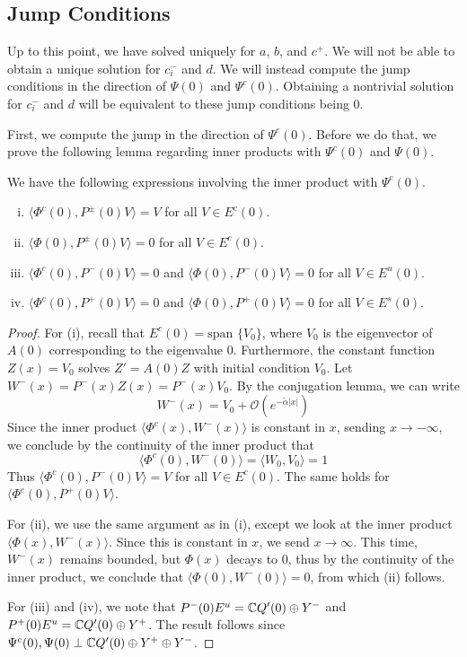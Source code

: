 \documentclass[thesis.tex]{subfiles}
\begin{document}
\subsection{Jump Conditions}
Up to this point, we have solved uniquely for $a$, $b$, and $c^+$. We will not be able to obtain a unique solution for $c_i^-$ and $d$. We will instead compute the jump conditions in the direction of $\Psi(0)$ and $\Psi^c(0)$. Obtaining a nontrivial solution for $c_i^-$ and $d$ will be equivalent to these jump conditions being 0.

First, we compute the jump in the direction of $\Psi^c(0)$. Before we do that, we prove the following lemma regarding inner products with $\Psi^c(0)$ and $\Psi(0)$.

\begin{lemma}\label{PsiIP}
We have the following expressions involving the inner product with $\Psi^c(0)$.
\begin{enumerate}[(i)]
	\item $\langle \Phi^c(0), P^\pm(0) V \rangle = V$ for all $V \in E^c(0)$.
	\item $\langle \Phi(0), P^\pm(0) V \rangle = 0$ for all $V \in E^c(0)$.
	\item $\langle \Phi^c(0), P^-(0) V \rangle = 0$ and $\langle \Phi(0), P^-(0) V \rangle = 0$ for all $V \in E^u(0)$.
	\item $\langle \Phi^c(0), P^+(0) V \rangle = 0$ and $\langle \Phi(0), P^+(0) V \rangle = 0$ for all $V \in E^s(0)$.
\end{enumerate}
\begin{proof}
For (i), recall that $E^c(0) = \text{span }\{ V_0 \}$, where $V_0$ is the eigenvector of $A(0)$ corresponding to the eigenvalue 0. Furthermore, the constant function $Z(x) = V_0$ solves $Z' = A(0) Z$ with initial condition $V_0$. Let $W^-(x) = P^-(x) Z(x) = P^-(x) V_0$. By the conjugation lemma, we can write
\[
W^-(x) = V_0 + \mathcal{O}({e^{-\tilde{\alpha}|x|}})
\]
Since the inner product $\langle \Phi^c(x), W^-(x) \rangle$ is constant in $x$, sending $x \rightarrow -\infty$, we conclude by the continuity of the inner product that
\[
\langle \Phi^c(0), W^-(0) \rangle = \langle W_0, V_0 \rangle = 1 
\]
Thus $\langle \Phi^c(0), P^-(0) V \rangle = V$ for all $V \in E^c(0)$. The same holds for $\langle \Phi^c(0), P^+(0) V \rangle$.

For (ii), we use the same argument as in (i), except we look at the inner product $\langle \Phi(x), W^-(x) \rangle$. Since this is constant in $x$, we send $x \rightarrow \infty$. This time, $W^-(x)$ remains bounded, but $\Phi(x)$ decays to 0, thus by the continuity of the inner product, we conclude that $\langle \Phi(0), W^-(0) \rangle = 0$, from which (ii) follows.

For (iii) and (iv), we note that $P^-(0)E^u = {\mathbb C} Q'(0) \oplus Y^-$ and $P^+(0)E^u = {\mathbb C} Q'(0) \oplus Y^+$. The result follows since $\Psi^c(0), \Psi(0) \perp {\mathbb C} Q'(0) \oplus Y^+ \oplus Y^-$.
\end{proof}
\end{lemma}
\end{document}
